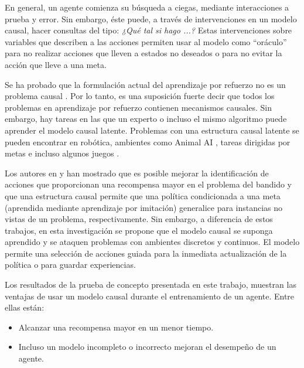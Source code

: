 En general, un agente comienza su búsqueda a ciegas,
mediante interacciones a prueba y error.
Sin embargo, éste puede, a través de intervenciones
en un modelo causal, hacer consultas del tipo: \textit{¿Qué tal si hago ...?} Estas intervenciones sobre variables 
que describen a las acciones permiten usar al modelo
como ``oráculo'' para no realizar acciones que lleven
a estados no deseados o para no evitar la acción que
lleve a una meta.

Se ha probado que la formulación actual del aprendizaje
por refuerzo no es un problema causal \cite{gonzalezsoto2019reinforcement}.
Por lo tanto, es una suposición fuerte 
decir que todos los problemas 
en aprendizaje por refuerzo contienen mecanismos causales. 
Sin embargo, hay tareas en las
que un experto o incluso el mismo algoritmo puede
aprender el modelo causal latente.
Problemas con una estructura causal latente
se pueden encontrar en robótica, ambientes como Animal AI \cite{beyret2019animalai}, 
tareas dirigidas por metas \cite{nair2019causal} e
incluso algunos juegos \cite{madumal2019explainable}.



Los autores en  \cite{lattimore2016causal} y \cite{nair2019causal} han mostrado
que es posible mejorar la identificación de acciones que proporcionan una recompensa mayor en
el problema del bandido y 
que una estructura causal permite
que una política condicionada a una
meta (aprendida mediante aprendizaje por imitación) generalice para instancias no vistas de 
un problema, respectivamente.
Sin embargo, a diferencia de estos trabajos,
en esta investigación 
se propone que el modelo causal se suponga 
aprendido y se ataquen problemas con ambientes discretos 
y continuos. El modelo permite una selección de acciones 
guiada para la inmediata actualización de la política
o para guardar experiencias.

Los resultados de la prueba de concepto presentada en este trabajo, 
muestran las ventajas de usar un modelo causal durante el entrenamiento de un agente. Entre ellas están: 
\begin{itemize}
    \item Alcanzar una recompensa mayor en un menor tiempo.
    \item Incluso un modelo incompleto o incorrecto mejoran el desempeño de un agente.
\end{itemize}

